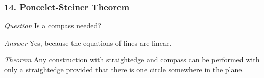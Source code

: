 \documentclass{beamer}
\begin{document}

\begin{frame}
\frametitle{14. Poncelet-Steiner Theorem}

\textit{Question} Is a compass needed?

\medskip

\textit{Answer} Yes, because the equations of lines are linear.

\bigskip

%

\textit{Theorem} Any construction with straightedge and compass can be performed with only a straightedge provided that there is one circle somewhere in the plane.


\end{frame}
\end{document}
